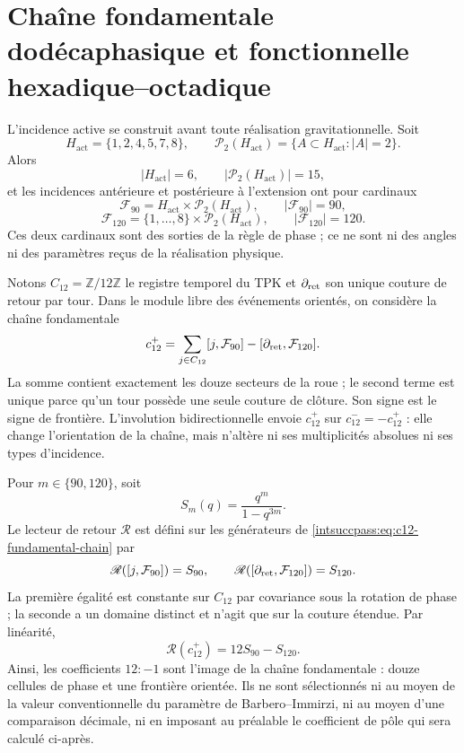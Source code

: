\section{Chaîne fondamentale dodécaphasique et fonctionnelle hexadique--octadique}

L’incidence active se construit avant toute réalisation gravitationnelle.
Soit
\[
 H_{\mathrm{act}}=\{1,2,4,5,7,8\},
 \qquad
 \mathcal P_2(H_{\mathrm{act}})
 =\{A\subset H_{\mathrm{act}}:|A|=2\}.
\]
Alors
\[
 |H_{\mathrm{act}}|=6,
 \qquad
 |\mathcal P_2(H_{\mathrm{act}})|=15,
\]
et les incidences antérieure et postérieure à l’extension ont pour cardinaux
\[
 \mathcal F_{90}=H_{\mathrm{act}}\times
 \mathcal P_2(H_{\mathrm{act}}),
 \qquad |\mathcal F_{90}|=90,
\]
\[
 \mathcal F_{120}=\{1,\ldots,8\}\times
 \mathcal P_2(H_{\mathrm{act}}),
 \qquad |\mathcal F_{120}|=120.
\]
Ces deux cardinaux sont des sorties de la règle de phase ; ce ne sont ni des angles ni
des paramètres reçus de la réalisation physique.

Notons \(C_{12}=\mathbb Z/12\mathbb Z\) le registre temporel du TPK et
\(\partial_{\rm ret}\) son unique couture de retour par tour. Dans le
module libre des événements orientés, on considère la chaîne fondamentale
\begin{equation}
 c_{12}^{+}
 =\sum_{j\in C_{12}}[j,\mathcal F_{90}]
  -[\partial_{\rm ret},\mathcal F_{120}].
 \label{intsuccpass:eq:c12-fundamental-chain}
\end{equation}
La somme contient exactement les douze secteurs de la roue ; le second
terme est unique parce qu’un tour possède une seule couture de clôture. Son signe
est le signe de frontière. L’involution bidirectionnelle envoie
\(c_{12}^{+}\) sur \(c_{12}^{-}=-c_{12}^{+}\) : elle change l’orientation de la
chaîne, mais n’altère ni ses multiplicités absolues ni ses types
d’incidence.

Pour \(m\in\{90,120\}\), soit
\[
 S_m(q)=\frac{q^m}{1-q^{3m}}.
\]
Le lecteur de retour \(\mathscr R\) est défini sur les générateurs de
\eqref{intsuccpass:eq:c12-fundamental-chain} par
\[
 \mathscr R([j,\mathcal F_{90}])=S_{90},
 \qquad
 \mathscr R([\partial_{\rm ret},\mathcal F_{120}])=S_{120}.
\]
La première égalité est constante sur \(C_{12}\) par covariance sous la
rotation de phase ; la seconde a un domaine distinct et n’agit que sur la
couture étendue. Par linéarité,
\begin{equation}
 \boxed{\mathscr R(c_{12}^{+})=12S_{90}-S_{120}.}
 \label{intsuccpass:eq:dodecaphase-forces-12minus1}
\end{equation}
Ainsi, les coefficients \(12:-1\) sont l’image de la chaîne fondamentale : douze
cellules de phase et une frontière orientée. Ils ne sont sélectionnés ni au moyen de la valeur
conventionnelle du paramètre de Barbero--Immirzi, ni au moyen d’une comparaison
décimale, ni en imposant au préalable le coefficient de pôle qui sera calculé
ci-après.

